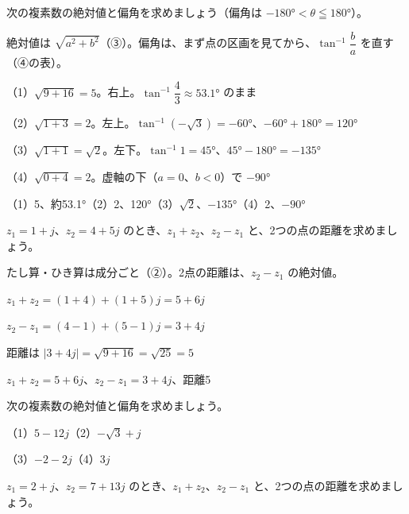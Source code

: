 
\begin{reidai}[絶対値と偏角]
次の複素数の絶対値と偏角を求めましょう（偏角は $-180°<\theta\leqq180°$）。\par
\noindent {}\par
\kangaekata 絶対値は $\sqrt{a^2+b^2}$（③）。偏角は、まず点の区画を見てから、$\tan^{-1}\dfrac{b}{a}$ を直す（④の表）。\par
\shiki{}\zw{} （1）$\sqrt{9+16}=5$。右上。$\tan^{-1}\dfrac{4}{3}\approx53.1°$ のまま\par
\bkvijq （2）$\sqrt{1+3}=2$。左上。$\tan^{-1}(-\sqrt3)=-60°$、$-60°+180°=120°$\par
\bkvijq （3）$\sqrt{1+1}=\sqrt2$。左下。$\tan^{-1}1=45°$、$45°-180°=-135°$\par
\bkvijq （4）$\sqrt{0+4}=2$。虚軸の下（$a=0$、$b<0$）で $-90°$\par
\kotae{}\zw{} （1）5、約53.1°\quad（2）2、120°\quad（3）$\sqrt2$、$-135°$\quad（4）2、$-90°$
\end{reidai}

\begin{reidai}[和・差と、2点の距離]
$z_1=1+j$、$z_2=4+5j$ のとき、$z_1+z_2$、$z_2-z_1$ と、2つの点の距離を求めましょう。\par
\kangaekata たし算・ひき算は成分ごと（②）。2点の距離は、$z_2-z_1$ の絶対値。\par
\shiki{}\zw{} $z_1+z_2=(1+4)+(1+5)j=5+6j$\par
\bkvija $z_2-z_1=(4-1)+(5-1)j=3+4j$\par
\bkvija 距離は $|3+4j|=\sqrt{9+16}=\sqrt{25}=5$\par
\kotae{}\zw{} $z_1+z_2=5+6j$、$z_2-z_1=3+4j$、距離5
\end{reidai}

\noindent\begin{minipage}[t]{0.485\linewidth}\vspace{0pt}
\begin{jibun}
次の複素数の絶対値と偏角を求めましょう。\par
（1）$5-12j$\newline（2）$-\sqrt3+j$\par
（3）$-2-2j$\newline（4）$3j$
\end{jibun}
\end{minipage}\hfill
\begin{minipage}[t]{0.485\linewidth}\vspace{0pt}
\begin{jibun}
$z_1=2+j$、$z_2=7+13j$ のとき、$z_1+z_2$、$z_2-z_1$ と、2つの点の距離を求めましょう。
\end{jibun}
\end{minipage}

